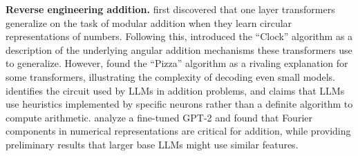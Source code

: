 


\textbf{Reverse engineering addition.} \citet{liu2022towards} first discovered that one layer transformers generalize on the task of modular addition when they learn circular representations of numbers. Following this, \citet{nanda2023progress} introduced the ``Clock'' algorithm as a description of the underlying angular addition mechanisms these transformers use to generalize. However, \citet{zhong2023the} found the ``Pizza'' algorithm as a rivaling explanation for some transformers, illustrating the complexity of decoding even small models.  \citet{Stolfo_Belinkov_Sachan_2023} identifies the circuit used by LLMs in addition problems, and \citet{Nikankin_Reusch_Mueller_Belinkov_2024} claims that LLMs use heuristics implemented by specific neurons rather than a definite algorithm to compute arithmetic. \citet{zhou2024pretrained} analyze a fine-tuned GPT-2 and found that Fourier components in numerical representations are critical for addition, while providing preliminary results that larger base LLMs might use similar features.
